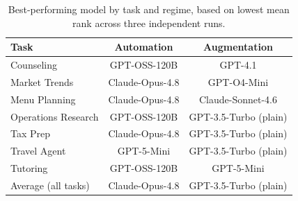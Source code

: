 \begin{table}[t]
    \centering
    \caption{Best-performing model by task and regime, based on lowest mean rank across three independent runs.}
    \label{tab:best-model-by-task}
    \small
    \begin{tabular}{lcc}
        \toprule
        Task & Automation & Augmentation \\
        \midrule
        Counseling & GPT-OSS-120B & GPT-4.1 \\
        Market Trends & Claude-Opus-4.8 & GPT-O4-Mini \\
        Menu Planning & Claude-Opus-4.8 & Claude-Sonnet-4.6 \\
        Operations Research & GPT-OSS-120B & GPT-3.5-Turbo (plain) \\
        Tax Prep & Claude-Opus-4.8 & GPT-3.5-Turbo (plain) \\
        Travel Agent & GPT-5-Mini & GPT-3.5-Turbo (plain) \\
        Tutoring & GPT-OSS-120B & GPT-5-Mini \\
        Average (all tasks) & Claude-Opus-4.8 & GPT-3.5-Turbo (plain) \\
        \bottomrule
    \end{tabular}
\end{table}
